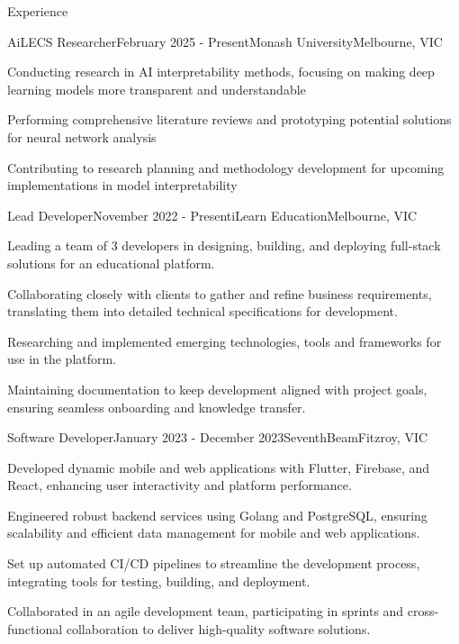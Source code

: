 \documentclass[
	10pt, %
]{resume} %
\begin{document}
\begin{rSection}{Experience}

	\begin{rSubsection}{AiLECS Researcher}{February 2025 - Present}{Monash University}{Melbourne, VIC}
		\item Conducting research in AI interpretability methods, focusing on making deep learning models more transparent and understandable
		\item Performing comprehensive literature reviews and prototyping potential solutions for neural network analysis
		\item Contributing to research planning and methodology development for upcoming implementations in model interpretability
	\end{rSubsection}


	\begin{rSubsection}{Lead Developer}{November 2022 - Present}{iLearn Education}{Melbourne, VIC}
		\item Leading a team of 3 developers in designing, building, and deploying full-stack solutions for an educational platform.
		\item Collaborating closely with clients to gather and refine business requirements, translating them into detailed technical specifications for development.
		\item Researching and implemented emerging technologies, tools and frameworks for use in the platform.
		\item Maintaining documentation to keep development aligned with project goals, ensuring seamless onboarding and knowledge transfer.
	\end{rSubsection}


	\begin{rSubsection}{Software Developer}{January 2023 - December 2023}{SeventhBeam}{Fitzroy, VIC}
		\item Developed dynamic mobile and web applications with Flutter, Firebase, and React, enhancing user interactivity and platform performance.
		\item Engineered robust backend services using Golang and PostgreSQL, ensuring scalability and efficient data management for mobile and web applications.
		\item Set up automated CI/CD pipelines to streamline the development process, integrating tools for testing, building, and deployment.
		\item Collaborated in an agile development team, participating in sprints and cross-functional collaboration to deliver high-quality software solutions.	\end{rSubsection}

\end{rSection}
\end{document}
